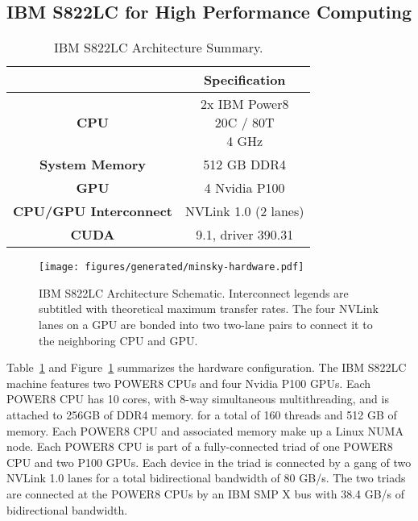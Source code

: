 \subsection{IBM S822LC for High Performance Computing}
\label{sec:s822lc}

\begin{table}[ht]
    \centering
    \caption[IBM S822LC Architecture Summary]{IBM S822LC Architecture Summary.}
    \label{tab:minsky}
    \begin{tabular}{cc}
    \hline
    \textbf{}                     & \textbf{Specification}                         \\ \hline
    \textbf{CPU}                  & \makecell{2x IBM Power8 \\ 20C / 80T \\ 4 GHz} \\ \hline
    \textbf{System Memory}        & 512 GB DDR4                                    \\ \hline
	\textbf{GPU}                  & 4 Nvidia P100                                  \\ \hline
	\textbf{CPU/GPU Interconnect} & NVLink 1.0 (2 lanes)                           \\ \hline
	\textbf{CUDA}                 & 9.1, driver 390.31                             \\ \hline
    \end{tabular}
\end{table}

\begin{figure}[ht]
    \centering
	\texttt{[image: figures/generated/minsky-hardware.pdf]}
    \caption[IBM S822LC Architecture Schematic]{
		IBM S822LC Architecture Schematic.
		Interconnect legends are subtitled with theoretical maximum transfer rates.
		The four NVLink lanes on a GPU are bonded into two two-lane pairs to connect it to the neighboring CPU and GPU.
	}
    \label{fig:topo-minsky-simple}
\end{figure}

Table~\ref{tab:minsky} and Figure~\ref{fig:topo-minsky-simple} summarizes the hardware configuration.
The IBM S822LC machine features two POWER8 CPUs and four Nvidia P100 GPUs\cite{caldeira2016s822lc}.
Each POWER8 CPU has 10 cores, with 8-way simultaneous multithreading, and is attached to 256GB of DDR4 memory. for a total of 160 threads and 512 GB of memory.
Each POWER8 CPU and associated memory make up a Linux NUMA node.
Each POWER8 CPU is part of a fully-connected triad of one POWER8 CPU and two P100 GPUs.
Each device in the triad is connected by a gang of two NVLink 1.0 lanes for a total bidirectional bandwidth of 80 GB/s.
The two triads are connected at the POWER8 CPUs by an IBM SMP X bus with 38.4 GB/s of bidirectional bandwidth.



